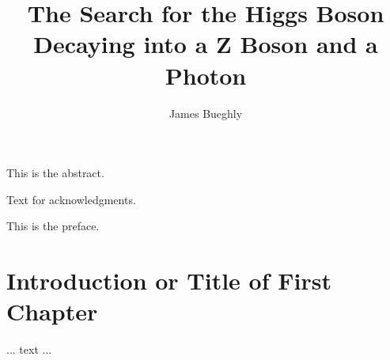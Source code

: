 \documentclass[12pt]{template/nuthesis}
\author{James Bueghly}
\title{The Search for the Higgs Boson Decaying into a Z Boson and a Photon}
\begin{document}
%	
%


\frontmatter		%

\maketitle		%

\copyrightpage		%


\abstract		%

This is the abstract.

\acknowledgements	%

Text for acknowledgments.

\preface		%

This is the preface.


%
%
%
%
%
%
%
%

\clearpage{} %
\tableofcontents	%

\clearpage{} %
\listoftables		%

\clearpage{} %
\listoffigures		%



\mainmatter             %



\chapter{Introduction or Title of First Chapter}	%
	... text ...		%
\end{document}

